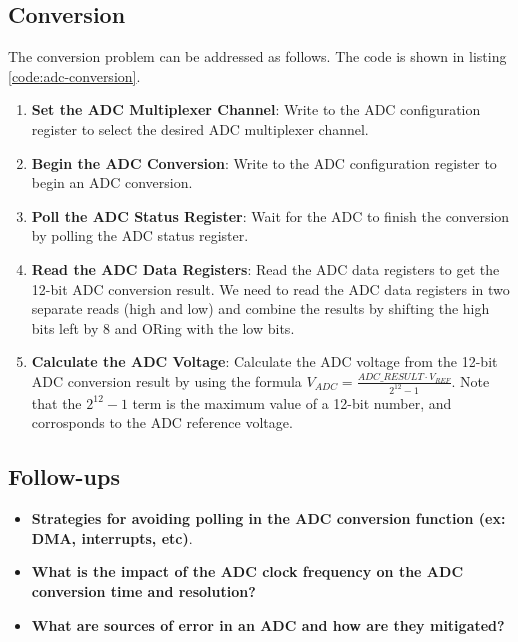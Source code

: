 \documentclass[main.tex]{subfiles}
\begin{document}


\subsection{Conversion}
The conversion problem can be addressed as follows. The code is shown in listing \ref{code:adc-conversion}.
\begin{enumerate}
    \item \textbf{Set the ADC Multiplexer Channel}: Write to the ADC configuration register to select the desired ADC multiplexer channel.
    \item \textbf{Begin the ADC Conversion}: Write to the ADC configuration register to begin an ADC conversion.
    \item \textbf{Poll the ADC Status Register}: Wait for the ADC to finish the conversion by polling the ADC status register.
    \item \textbf{Read the ADC Data Registers}: Read the ADC data registers to get the 12-bit ADC conversion result. We need to read the ADC data registers in two separate reads (high and low) and combine the results by shifting the high bits left by 8 and ORing with the low bits.
    \item \textbf{Calculate the ADC Voltage}: Calculate the ADC voltage from the 12-bit ADC conversion result by using the formula $V_{ADC} = \frac{ADC\_RESULT \cdot V_{REF}}{2^{12} - 1}$. Note that the $2^{12} - 1$ term is the maximum value of a 12-bit number, and corrosponds to the ADC reference voltage.
\end{enumerate}



\subsection{Follow-ups}
\begin{itemize}
    \item \textbf{Strategies for avoiding polling in the ADC conversion function (ex: DMA, interrupts, etc)}.
    \item \textbf{What is the impact of the ADC clock frequency on the ADC conversion time and resolution?}
    \item \textbf{What are sources of error in an ADC and how are they mitigated?}
\end{itemize}
\end{document}
